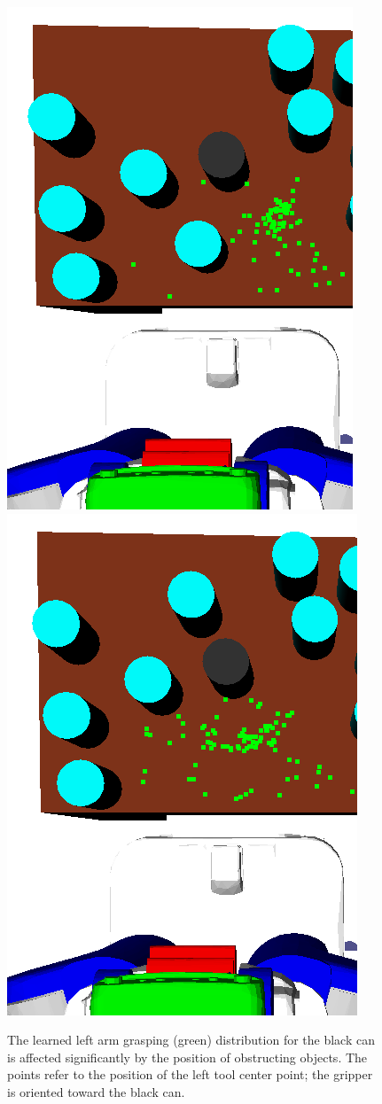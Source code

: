 \begin{figure}[t]
    \includegraphics[scale=0.2]{images/grasp_context_2.png}
    \includegraphics[scale=0.2]{images/grasp_context_3.png}
  \caption{\small{The learned left arm grasping (green) distribution for the black can is affected significantly
by the position of obstructing objects. The points refer to the position of the left tool center point; the gripper
is oriented toward the black can.}}
  \label{fig:context}
\end{figure}

